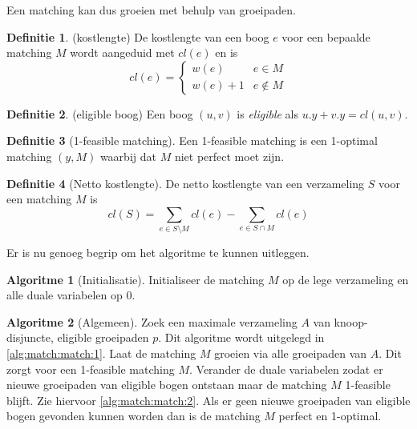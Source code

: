 \documentclass[conference]{IEEEtran}
\theoremstyle{definition}
\newtheorem{definition}{Definitie}[section]
\newtheorem{algorithmm}{Algoritme}[section]
\let \oldforall \forall
\renewcommand{\forall}{\oldforall\,}
\begin{document}
Een matching kan dus groeien met behulp van groeipaden.

\begin{definition}(kostlengte)
    De kostlengte van een boog $e$ voor een bepaalde matching $M$ wordt aangeduid met $cl(e)$ en is
    \begin{equation*}
        cl(e) = \begin{cases}
            w(e) & e \in M \\
            w(e) + 1 & e \notin M
        \end{cases}
    \end{equation*}
\end{definition}

\begin{definition}(eligible boog)
    Een boog $(u, v)$ is \textit{eligible} als $u.y + v.y = cl(u, v)$.
\end{definition}

\begin{definition}[1-feasible matching]
    Een 1-feasible matching is een 1-optimal matching $(y, M)$ waarbij dat $M$ niet perfect moet zijn.
\end{definition}

\begin{definition}[Netto kostlengte]
    De netto kostlengte van een verzameling $S$ voor een matching $M$ is
    \begin{equation*}
        cl(S) = \sum_{e \in S \setminus M} cl(e) - \sum_{e \in S \cap M} cl(e)
    \end{equation*}
\end{definition}

Er is nu genoeg begrip om het algoritme te kunnen uitleggen.


\begin{algorithmm}[Initialisatie]
    Initialiseer de matching $M$ op de lege verzameling en alle duale variabelen op $0$.
\end{algorithmm}

\begin{algorithmm}[Algemeen]
    Zoek een maximale verzameling $A$ van knoop-disjuncte, eligible groeipaden $p$. Dit algoritme wordt uitgelegd in \ref{alg:match:match:1}. Laat de matching $M$ groeien via alle groeipaden van $A$. Dit zorgt voor een 1-feasible matching $M$. Verander de duale variabelen zodat er nieuwe groeipaden van eligible bogen ontstaan maar de matching $M$ 1-feasible blijft. Zie hiervoor \ref{alg:match:match:2}. Als er geen nieuwe groeipaden van eligible bogen gevonden kunnen worden dan is de matching $M$ perfect en 1-optimal.
\end{algorithmm}
\end{document}
